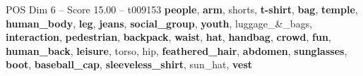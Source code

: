 \begin{textsample}{POS Dim 6 – Score 15.00 – t009153}  \label{ex:f6_pos_003}
\textbf{people}, \textbf{arm}, shorts, \textbf{t-shirt}, \textbf{bag}, \textbf{temple}, \textbf{human\_body}, \textbf{leg}, \textbf{jeans}, \textbf{social\_group}, \textbf{youth}, luggage\_\&\_bags, \textbf{interaction}, \textbf{pedestrian}, \textbf{backpack}, \textbf{waist}, \textbf{hat}, \textbf{handbag}, \textbf{crowd}, \textbf{fun}, \textbf{human\_back}, \textbf{leisure}, torso, hip, \textbf{feathered\_hair}, \textbf{abdomen}, \textbf{sunglasses}, \textbf{boot}, \textbf{baseball\_cap}, \textbf{sleeveless\_shirt}, sun\_hat, \textbf{vest}

\end{textsample}
